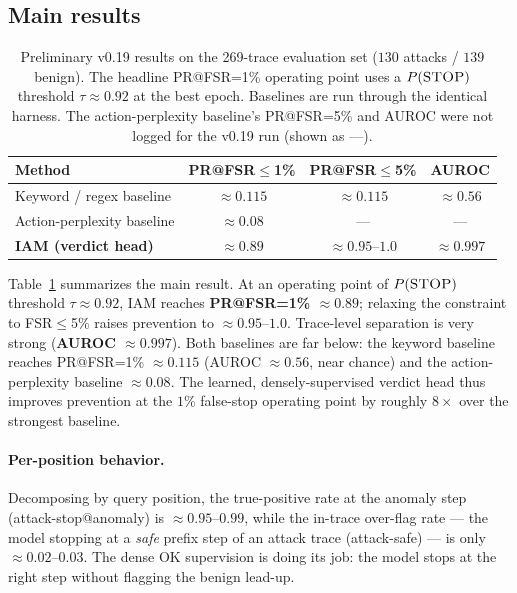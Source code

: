 \subsection{Main results}

\begin{table}[t]
  \centering
  \small
  \begin{tabular}{lccc}
    \toprule
    Method & PR@FSR$\le$1\% & PR@FSR$\le$5\% & AUROC \\
    \midrule
    Keyword / regex baseline      & $\approx 0.115$ & $\approx 0.115$ & $\approx 0.56$ \\
    Action-perplexity baseline    & $\approx 0.08$  & ---             & ---           \\
    \textbf{IAM (verdict head)} & $\mathbf{\approx 0.89}$ & $\mathbf{\approx 0.95\text{--}1.0}$ & $\mathbf{\approx 0.997}$ \\
    \bottomrule
  \end{tabular}
  \caption{Preliminary v0.19 results on the 269-trace evaluation set
  ($130$ attacks / $139$ benign). The headline PR@FSR=1\% operating point uses
  a $P(\textsc{STOP})$ threshold $\tau\approx 0.92$ at the best epoch. Baselines
  are run through the identical harness. The action-perplexity baseline's
  PR@FSR=5\% and AUROC were not logged for the v0.19 run (shown as ---).
  }
  \label{tab:main}
\end{table}

Table~\ref{tab:main} summarizes the main result. At an operating point of
$P(\textsc{STOP})$ threshold $\tau\approx 0.92$, IAM reaches
\textbf{PR@FSR=1\% $\approx 0.89$}; relaxing the constraint to FSR$\le$5\%
raises prevention to $\approx 0.95\text{--}1.0$. Trace-level separation is very
strong (\textbf{AUROC $\approx 0.997$}). Both baselines are far below: the
keyword baseline reaches PR@FSR=1\% $\approx 0.115$ (AUROC $\approx 0.56$, near
chance) and the action-perplexity baseline $\approx 0.08$. The learned,
densely-supervised verdict head thus improves prevention at the $1\%$ false-stop
operating point by roughly $8\times$ over the strongest baseline.

\paragraph{Per-position behavior.}
Decomposing by query position, the true-positive rate at the anomaly step
(attack-stop@anomaly) is $\approx 0.95\text{--}0.99$, while the in-trace
over-flag rate --- the model stopping at a \emph{safe} prefix step of an attack
trace (attack-safe) --- is only $\approx 0.02\text{--}0.03$. The dense
\textsc{OK} supervision is doing its job: the model stops at the right step
without flagging the benign lead-up.

